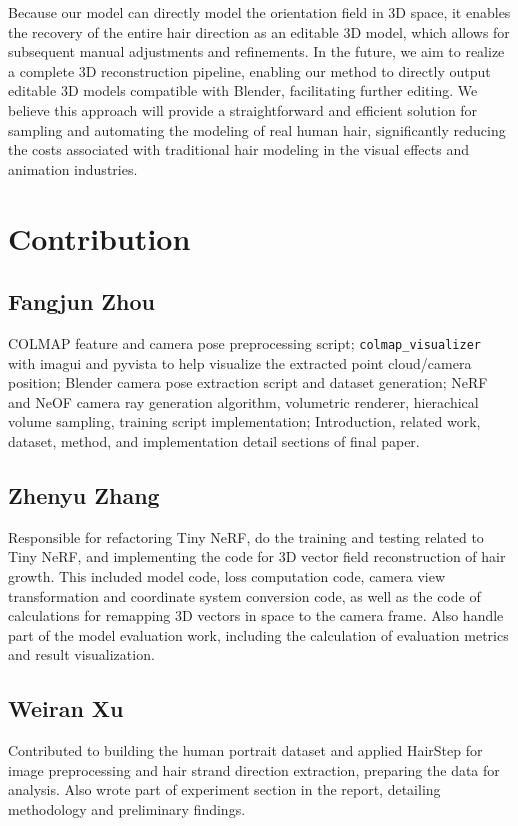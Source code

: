 \documentclass{article}
\begin{document}
Because our model can directly model the orientation field in 3D space, it enables the recovery of the entire hair direction as an editable 3D model, which allows for subsequent manual adjustments and refinements. In the future, we aim to realize a complete 3D reconstruction pipeline, enabling our method to directly output editable 3D models compatible with Blender, facilitating further editing. We believe this approach will provide a straightforward and efficient solution for sampling and automating the modeling of real human hair, significantly reducing the costs associated with traditional hair modeling in the visual effects and animation industries.

\newpage




\newpage

\section{Contribution}

\subsection{Fangjun Zhou}

COLMAP feature and camera pose preprocessing script; \texttt{colmap\_visualizer} with imagui and pyvista to help visualize the extracted point cloud/camera position; Blender camera pose extraction script and dataset generation; NeRF and NeOF camera ray generation algorithm, volumetric renderer, hierachical volume sampling, training script implementation; Introduction, related work, dataset, method, and implementation detail sections of final paper.

\subsection{Zhenyu Zhang}

Responsible for refactoring Tiny NeRF, do the training and testing related to Tiny NeRF, and implementing the code for 3D vector field reconstruction of hair growth. This included model code, loss computation code, camera view transformation and coordinate system conversion code, as well as the code of calculations for remapping 3D vectors in space to the camera frame. Also handle part of the model evaluation work, including the calculation of evaluation metrics and result visualization.

\subsection{Weiran Xu}

Contributed to building the human portrait dataset and applied HairStep for image preprocessing and hair strand direction extraction, preparing the data for analysis. Also wrote part of experiment section in the report, detailing methodology and preliminary findings.
\end{document}
